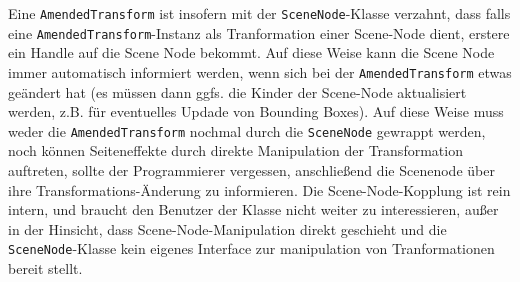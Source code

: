 	
	Eine \lstinline|AmendedTransform| ist insofern mit der \lstinline|SceneNode|-Klasse verzahnt, dass falls eine
	\lstinline|AmendedTransform|-Instanz als Tranformation einer Scene-Node dient, erstere ein Handle auf die Scene Node 
	bekommt. Auf diese Weise kann die Scene Node immer automatisch informiert werden, wenn sich bei der 
	\lstinline|AmendedTransform| etwas geändert hat (es müssen dann ggfs. die Kinder der Scene-Node aktualisiert werden,
	z.B. für eventuelles Updade von Bounding Boxes). Auf diese Weise muss weder die \lstinline|AmendedTransform|
	nochmal durch die \lstinline|SceneNode| gewrappt werden, noch können Seiteneffekte durch direkte Manipulation der 
	Transformation auftreten, sollte der Programmierer vergessen, anschließend die Scenenode über ihre 
	Transformations-Änderung zu informieren.
	Die Scene-Node-Kopplung ist rein intern, und braucht den Benutzer der Klasse nicht weiter zu interessieren,
	außer in der Hinsicht, dass Scene-Node-Manipulation direkt geschieht und die \lstinline|SceneNode|-Klasse
	kein eigenes Interface zur manipulation von Tranformationen bereit stellt.
	
